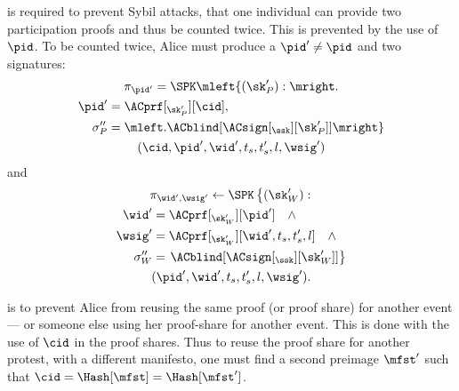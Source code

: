  is required to prevent Sybil attacks, \ie that one individual 
can provide two participation proofs and thus be counted twice.
This is prevented by the use of \(\pid\).
To be counted twice, Alice must produce a \(\pid'\neq \pid\) and two signatures:
\begin{multline*}
\pi_{\pid'} = \SPK\mleft\{ (\sk_P') : \mright. \\
  \begin{aligned}
    \pid' &= \ACprf[_{\sk_P'}][\cid], \\
    \sigma_P'' &= \mleft. \ACblind[\ACsign[_{\ssk}][\sk_P']] \mright\}
  \end{aligned} \\
    (\cid, \pid', \wid', t_s, t_s', l, \wsig')
\end{multline*}
and
\begin{multline*}
  \pi_{\wid', \wsig'}\gets \SPK\left\{ (\sk_W') : \right. \\
    \begin{aligned}
      \wid' &= \ACprf[_{\sk_W'}][\pid'] \quad \land \\
      \wsig' &= \ACprf[_{\sk_W'}][\wid', t_s, t_s', l] \quad \land \\
      \sigma_W'' &= \left. \ACblind[\ACsign[_{\ssk}][\sk_W']] \right\}
    \end{aligned} \\
      (\pid', \wid', t_s, t_s', l, \wsig').
\end{multline*}


 is to prevent Alice from reusing the same proof (or proof 
share) for another event --- or someone else using her proof-share for another 
event.
This is done with the use of \(\cid\) in the proof shares.
Thus to reuse the proof share for another protest, with a different manifesto, 
one must find a second preimage \(\mfst'\) such that \(\cid = \Hash[\mfst] = 
  \Hash[\mfst']\).

